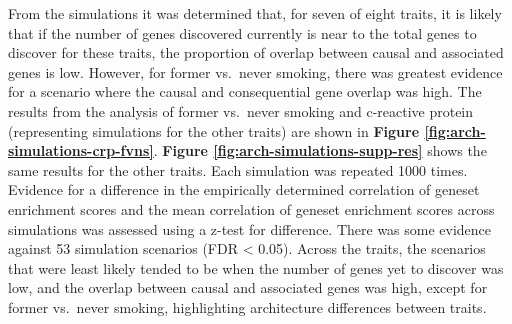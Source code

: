 \documentclass[11pt,twoside]{bristolthesis}
\begin{document}
From the simulations it was determined that, for seven of eight traits, it is likely that if the number of genes discovered currently is near to the total genes to discover for these traits, the proportion of overlap between causal and associated genes is low. However, for former vs.~never smoking, there was greatest evidence for a scenario where the causal and consequential gene overlap was high. The results from the analysis of former vs.~never smoking and c-reactive protein (representing simulations for the other traits) are shown in \textbf{Figure \ref{fig:arch-simulations-crp-fvns}}. \textbf{Figure \ref{fig:arch-simulations-supp-res}} shows the same results for the other traits. Each simulation was repeated 1000 times. Evidence for a difference in the empirically determined correlation of geneset enrichment scores and the mean correlation of geneset enrichment scores across simulations was assessed using a z-test for difference. There was some evidence against 53 simulation scenarios (FDR \textless{} 0.05). Across the traits, the scenarios that were least likely tended to be when the number of genes yet to discover was low, and the overlap between causal and associated genes was high, except for former vs.~never smoking, highlighting architecture differences between traits.
\end{document}
